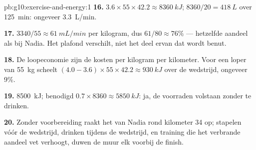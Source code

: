 \begin{solution}{pb:g10:exercise-and-energy:1}
\textbf{16.} $3.6 \times 55 \times 42.2 \approx \qty{8360}{kJ}$;
$8360/20 = \qty{418}{L}$ over \qty{125}{min}: ongeveer \qty{3.3}{L/min}.

\textbf{17.} $3340/55 \approx \qty{61}{mL/min}$ per kilogram, dus
$61/80 \approx 76\%$ --- hetzelfde aandeel als bij Nadia. Het plafond
verschilt, niet het deel ervan dat wordt benut.

\textbf{18.} De loopeconomie zijn de kosten per kilogram per kilometer.
Voor een loper van \qty{55}{kg} scheelt $(4.0 - 3.6) \times 55 \times 42.2 \approx
\qty{930}{kJ}$ over de wedstrijd, ongeveer 9\%.

\textbf{19.}  \qty{8500}{kJ}; benodigd  $0.7 \times
8360 \approx \qty{5850}{kJ}$: ja, de voorraden volstaan zonder te
drinken.

\textbf{20.} Zonder voorbereiding raakt het  van Nadia rond
kilometer 34 op;  stapelen vóór de wedstrijd, 
drinken tijdens de wedstrijd, en training die het verbrande aandeel vet
verhoogt, duwen de muur elk voorbij de finish.
\end{solution}
